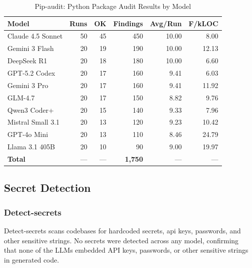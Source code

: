 \begin{table}[htbp]
    \centering
    \caption{Pip-audit: Python Package Audit Results by Model}
    \label{tab:tool_pipaudit}
    \small
    \begin{tabular}{@{} l r r r r r @{}}
        \toprule
        \textbf{Model} & \textbf{Runs} & \textbf{OK} & \textbf{Findings} & \textbf{Avg/Run} & \textbf{F/kLOC} \\
        \midrule
        Claude 4.5 Sonnet & 50 & 45 & 450 & 10.00 & 8.00 \\
        Gemini 3 Flash & 20 & 19 & 190 & 10.00 & 12.13 \\
        DeepSeek R1 & 20 & 18 & 180 & 10.00 & 6.60 \\
        GPT-5.2 Codex & 20 & 17 & 160 & 9.41 & 6.03 \\
        Gemini 3 Pro & 20 & 17 & 160 & 9.41 & 11.92 \\
        GLM-4.7 & 20 & 17 & 150 & 8.82 & 9.76 \\
        Qwen3 Coder+ & 20 & 15 & 140 & 9.33 & 7.96 \\
        Mistral Small 3.1 & 20 & 13 & 120 & 9.23 & 10.42 \\
        GPT-4o Mini & 20 & 13 & 110 & 8.46 & 24.79 \\
        Llama 3.1 405B & 20 & 10 & 90 & 9.00 & 19.97 \\
        \midrule
        \textbf{Total} & --- & --- & \textbf{1{,}750} & --- & --- \\
        \bottomrule
    \end{tabular}
\end{table}

\subsection{Secret Detection}

\subsubsection{Detect-secrets}

Detect-secrets scans codebases for hardcoded secrets, api keys, passwords, and other sensitive strings. No secrets were detected across any model, confirming that none of the LLMs embedded API keys, passwords, or other sensitive strings in generated code.

